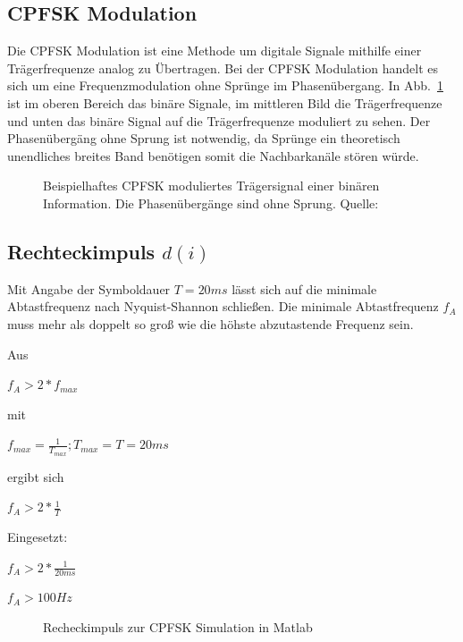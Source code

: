 \documentclass{article}
\begin{document}
\subsection{CPFSK Modulation}
Die \ac{CPFSK} Modulation ist eine Methode um digitale Signale mithilfe einer Trägerfrequenze analog zu Übertragen.
Bei der \ac{CPFSK} Modulation handelt es sich um eine Frequenzmodulation ohne Sprünge im Phasenübergang. In Abb.~\ref{fsk}
ist im oberen Bereich das binäre Signale, im mittleren Bild die Trägerfrequenze und unten das binäre Signal auf die Trägerfrequenze
moduliert zu sehen. Der Phasenübergäng ohne Sprung ist notwendig, da Sprünge ein theoretisch unendliches breites Band benötigen
somit die Nachbarkanäle stören würde.
\begin{figure}[!h]
    \centering
    \def\svgscale{0.3}
    \def\svgwidth{\columnwidth}
    
    \caption{Beispielhaftes \ac{CPFSK} moduliertes Trägersignal einer binären 
    Information. Die Phasenübergänge sind ohne Sprung. Quelle:~\cite{wiki:fsk}}
    \label{fsk}
\end{figure}
\subsection{Rechteckimpuls $d(i)$}\label{sec:rechteck}
Mit Angabe der Symboldauer $T = 20ms$ lässt sich auf die minimale Abtastfrequenz nach Nyquist-Shannon schließen.
Die minimale Abtastfrequenz $f_A$ muss mehr als doppelt so groß wie die höhste abzutastende Frequenz sein.

Aus
\begin{center}
 $
f_A > 2*f_{max}
$
\end{center}

mit 
\begin{center} $f_{max} = \frac{1}{T_{max}} ; T_{max} = T = 20ms$  \end{center}

ergibt sich

\begin{center}
$
f_A > 2*\frac{1}{T}
$
\end{center}

Eingesetzt:
\begin{center}
$f_A > 2*\frac{1}{20ms}$
\end{center}
\begin{center}
$f_A > 100Hz$   
\end{center}
\begin{figure}[!h]
    \centering
    \def\svgscale{0.3}
    \def\svgwidth{\columnwidth}
    
    \caption{Recheckimpuls zur \ac{CPFSK} Simulation in Matlab}
\end{figure}
\end{document}
